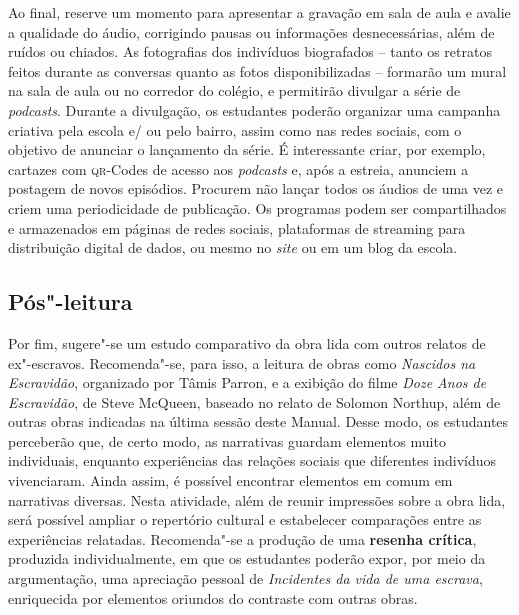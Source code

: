 \documentclass[12pt]{extarticle}
\begin{document}
Ao final, reserve um momento para apresentar a gravação em sala de aula
e avalie a qualidade do áudio, corrigindo pausas ou informações
desnecessárias, além de ruídos ou chiados. As fotografias dos indivíduos
biografados -- tanto os retratos feitos durante as conversas quanto as
fotos disponibilizadas -- formarão um mural na sala de aula ou no
corredor do colégio, e permitirão divulgar a série de \emph{podcasts}.
Durante a divulgação, os estudantes poderão organizar uma campanha
criativa pela escola e/ ou pelo bairro, assim como nas redes sociais,
com o objetivo de anunciar o lançamento da série. É interessante criar,
por exemplo, cartazes com \textsc{qr}-Codes de acesso aos \emph{podcasts} e, após
a estreia, anunciem a postagem de novos episódios. Procurem não lançar
todos os áudios de uma vez e criem uma periodicidade de publicação. Os
programas podem ser compartilhados e armazenados em páginas de redes
sociais, plataformas de streaming para distribuição digital de dados, ou
mesmo no \emph{site} ou em um blog da escola.

\subsection{Pós"-leitura}

\bnccativividadesposleitura

Por fim, sugere"-se um estudo comparativo da obra lida com
outros relatos de ex"-escravos. Recomenda"-se, para isso, a leitura de
obras como \emph{Nascidos na Escravidão}, organizado por Tâmis Parron, e
a exibição do filme \emph{Doze Anos de Escravidão}, de Steve McQueen,
baseado no relato de Solomon Northup, além de outras obras indicadas na
última sessão deste Manual. Desse modo, os estudantes perceberão que, de
certo modo, as narrativas guardam elementos muito individuais, enquanto
experiências das relações sociais que diferentes indivíduos vivenciaram.
Ainda assim, é possível encontrar elementos em comum em narrativas
diversas. Nesta atividade, além de reunir impressões sobre a obra lida,
será possível ampliar o repertório cultural e estabelecer comparações
entre as experiências relatadas. Recomenda"-se a produção de uma
\textbf{resenha crítica}, produzida individualmente, em que os
estudantes poderão expor, por meio da argumentação, uma apreciação
pessoal de \emph{Incidentes da vida de uma escrava}, enriquecida por
elementos oriundos do contraste com outras obras.
\end{document}
